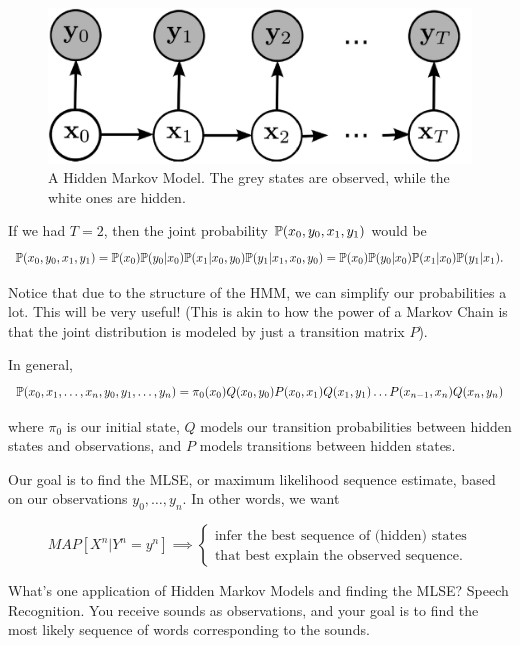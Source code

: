 \documentclass[11 pt]{scrartcl}
\begin{document}
\begin{figure}[!htb]
    \centering
    \includegraphics[scale = 0.2]{hmm.png} 
    \caption{A Hidden Markov Model. The grey states are observed, while the white ones are hidden.}
\end{figure}

\begin{example}
    If we had $T = 2$, then the joint probability $\mathbb P(x_0, y_0, x_1, y_1)$ would be 
    \[ \mathbb P(x_0, y_0, x_1, y_1) = \mathbb P(x_0) \mathbb P(y_0 | x_0) \mathbb P(x_1 | x_0, y_0) \mathbb P(y_1 | x_1, x_0, y_0) = \mathbb P(x_0) \mathbb P(y_0 | x_0) \mathbb P(x_1 | x_0) \mathbb P(y_1 | x_1).\]

    Notice that due to the structure of the HMM, we can simplify our probabilities a lot. This will be very useful! (This is akin to how the power of a Markov Chain is that the joint distribution is modeled by just a transition matrix $P$). 
\end{example}

In general, 
\[ \mathbb P(x_0, x_1, \dots, x_n, y_0, y_1, \dots, y_n) = \pi_0(x_0) Q(x_0, y_0) P(x_0, x_1) Q(x_1, y_1) \dots P(x_{n-1}, x_n) Q(x_n, y_n)\] 

where $\pi_0$ is our initial state, $Q$ models our transition probabilities between hidden states and observations, and $P$ models transitions between hidden states. 

Our goal is to find the MLSE, or maximum likelihood sequence estimate, based on our observations $y_0, \dots, y_n$. In other words, we want 

\[ MAP[X^n | Y^n = y^n] \implies \begin{cases} \text{infer the best sequence of (hidden) states} \\ \text{that best explain the observed sequence.} \end{cases} \]

What's one application of Hidden Markov Models and finding the MLSE? Speech Recognition. You receive sounds as observations, and your goal is to find the most likely sequence of words corresponding to the sounds. 
\end{document}
